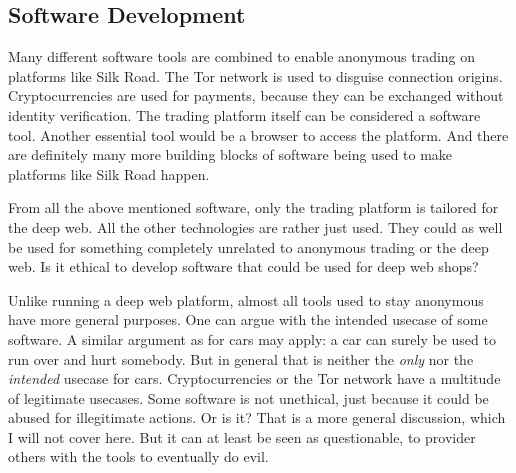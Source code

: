 \subsection{Software Development}

Many different software tools are combined to enable anonymous trading on platforms like Silk Road. The Tor network is used to disguise connection origins. Cryptocurrencies are used for payments, because they can be exchanged without identity verification. The trading platform itself can be considered a software tool. Another essential tool would be a browser to access the platform. And there are definitely many more building blocks of software being used to make platforms like Silk Road happen.

From all the above mentioned software, only the trading platform is tailored for the deep web. All the other technologies are rather just used. They could as well be used for something completely unrelated to anonymous trading or the deep web. Is it ethical to develop software that could be used for deep web shops?

Unlike running a deep web platform, almost all tools used to stay anonymous have more general purposes. One can argue with the intended usecase of some software. A similar argument as for cars may apply: a car can surely be used to run over and hurt somebody. But in general that is neither the \emph{only} nor the \emph{intended} usecase for cars. Cryptocurrencies or the Tor network have a multitude of legitimate usecases. Some software is not unethical, just because it could be abused for illegitimate actions. Or is it? That is a more general discussion, which I will not cover here. But it can at least be seen as questionable, to provider others with the tools to eventually do evil.